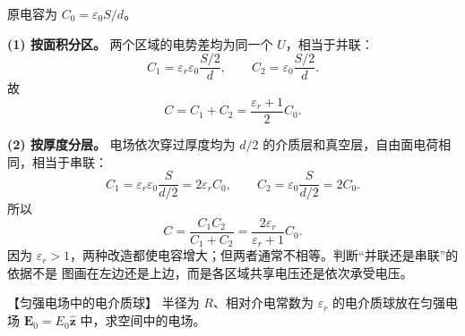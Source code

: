 {\begin{xesolution}
原电容为 $C_0=\varepsilon_0S/d$。

\textbf{(1) 按面积分区。} 两个区域的电势差均为同一个 $U$，相当于并联：
\[
 C_1=\varepsilon_r\varepsilon_0\frac{S/2}{d},\qquad
 C_2=\varepsilon_0\frac{S/2}{d}.
\]
故
\[
 \boxed{C=C_1+C_2=\frac{\varepsilon_r+1}{2}C_0}.
\]

\textbf{(2) 按厚度分层。} 电场依次穿过厚度均为 $d/2$ 的介质层和真空层，自由面电荷相同，相当于串联：
\[
 C_1=\varepsilon_r\varepsilon_0\frac S{d/2}=2\varepsilon_rC_0,
 \qquad C_2=\varepsilon_0\frac S{d/2}=2C_0.
\]
所以
\[
 \boxed{C=\frac{C_1C_2}{C_1+C_2}
 =\frac{2\varepsilon_r}{\varepsilon_r+1}C_0}.
\]
因为 $\varepsilon_r>1$，两种改造都使电容增大；但两者通常不相等。判断“并联还是串联”的依据不是
图画在左边还是上边，而是各区域共享电压还是依次承受电压。
\end{xesolution}



\begin{origexamplebox}{【匀强电场中的电介质球】}\label{ch20:ex:s35-4-6}
半径为 $R$、相对介电常数为 $\varepsilon_r$ 的电介质球放在匀强电场
$\boldsymbol E_0=E_0\hat{\boldsymbol z}$ 中，求空间中的电场。

\ThQDielectricSphere
\end{origexamplebox}\par\nopagebreak[4]



\begin{xesolution}
\par\noindent\begin{minipage}{\linewidth}
\dielectricSphereFieldFigure
{}
\end{minipage}\par\medskip
\ThADielectricSphere


\end{xesolution}}
